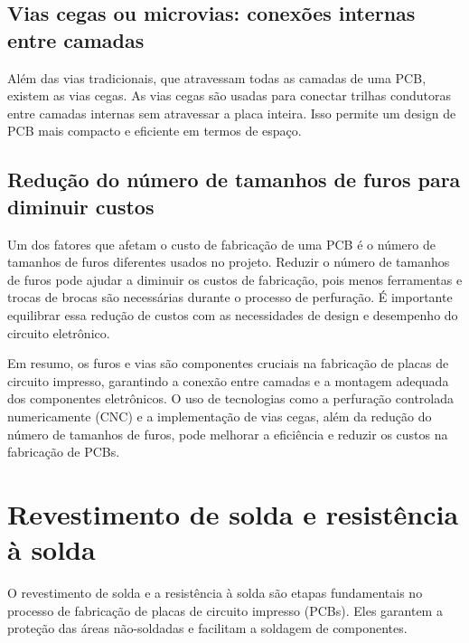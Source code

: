 \hypertarget{vias-cegas-ou-microvias-conexuxf5es-internas-entre-camadas}{%
\subsection{Vias cegas ou microvias: conexões internas entre camadas}\label{vias-cegas-ou-microvias-conexuxf5es-internas-entre-camadas}}

Além das vias tradicionais, que atravessam todas as camadas de uma PCB, existem as vias cegas. As vias cegas são usadas para conectar trilhas condutoras entre camadas internas sem atravessar a placa inteira. Isso permite um design de PCB mais compacto e eficiente em termos de espaço.

\hypertarget{reduuxe7uxe3o-do-nuxfamero-de-tamanhos-de-furos-para-diminuir-custos}{%
\subsection{Redução do número de tamanhos de furos para diminuir custos}\label{reduuxe7uxe3o-do-nuxfamero-de-tamanhos-de-furos-para-diminuir-custos}}

Um dos fatores que afetam o custo de fabricação de uma PCB é o número de tamanhos de furos diferentes usados no projeto. Reduzir o número de tamanhos de furos pode ajudar a diminuir os custos de fabricação, pois menos ferramentas e trocas de brocas são necessárias durante o processo de perfuração. É importante equilibrar essa redução de custos com as necessidades de design e desempenho do circuito eletrônico.

Em resumo, os furos e vias são componentes cruciais na fabricação de placas de circuito impresso, garantindo a conexão entre camadas e a montagem adequada dos componentes eletrônicos. O uso de tecnologias como a perfuração controlada numericamente (CNC) e a implementação de vias cegas, além da redução do número de tamanhos de furos, pode melhorar a eficiência e reduzir os custos na fabricação de PCBs.

\hypertarget{revestimento-de-solda-e-resistuxeancia-uxe0-solda}{%
\section{Revestimento de solda e resistência à solda}\label{revestimento-de-solda-e-resistuxeancia-uxe0-solda}}

O revestimento de solda e a resistência à solda são etapas fundamentais no processo de fabricação de placas de circuito impresso (PCBs). Eles garantem a proteção das áreas não-soldadas e facilitam a soldagem de componentes.

